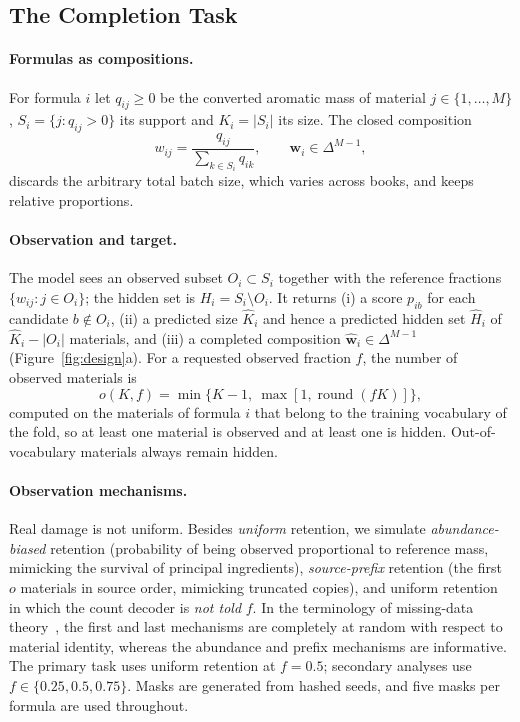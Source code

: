 \documentclass[applsci,article,submit,oneauthor]{Definitions/mdpi}
\begin{document}
\subsection{The Completion Task}
\label{sec:task}

\paragraph{Formulas as compositions.} For formula $i$ let $q_{ij}\ge0$ be the converted aromatic mass of material $j\in\{1,\dots,M\}$, $S_i=\{j:q_{ij}>0\}$ its support and $K_i=|S_i|$ its size. The closed composition~\cite{aitchison1982}
\begin{equation}
w_{ij}=\frac{q_{ij}}{\sum_{k\in S_i}q_{ik}},\qquad \bm w_i\in\Delta^{M-1},
\label{eq:closure}
\end{equation}
discards the arbitrary total batch size, which varies across books, and keeps relative proportions.

\paragraph{Observation and target.} The model sees an observed subset $O_i\subset S_i$ together with the reference fractions $\{w_{ij}:j\in O_i\}$; the hidden set is $H_i=S_i\setminus O_i$. It returns (i) a score $p_{ib}$ for each candidate $b\notin O_i$, (ii) a predicted size $\widehat K_i$ and hence a predicted hidden set $\widehat H_i$ of $\widehat K_i-|O_i|$ materials, and (iii) a completed composition $\widehat{\bm w}_i\in\Delta^{M-1}$ (Figure~\ref{fig:design}a). For a requested observed fraction $f$, the number of observed materials is
\begin{equation}
o(K,f)=\min\bigl\{K-1,\ \max[1,\operatorname{round}(fK)]\bigr\},
\label{eq:maskcount}
\end{equation}
computed on the materials of formula $i$ that belong to the training vocabulary of the fold, so at least one material is observed and at least one is hidden. Out-of-vocabulary materials always remain hidden.

\paragraph{Observation mechanisms.} Real damage is not uniform. Besides \emph{uniform} retention, we simulate \emph{abundance-biased} retention (probability of being observed proportional to reference mass, mimicking the survival of principal ingredients), \emph{source-prefix} retention (the first $o$ materials in source order, mimicking truncated copies), and uniform retention in which the count decoder is \emph{not told} $f$. In the terminology of missing-data theory~\cite{rubin1976}, the first and last mechanisms are completely at random with respect to material identity, whereas the abundance and prefix mechanisms are informative. The primary task uses uniform retention at $f=0.5$; secondary analyses use $f\in\{0.25,0.5,0.75\}$. Masks are generated from hashed seeds, and five masks per formula are used throughout.
\end{document}
